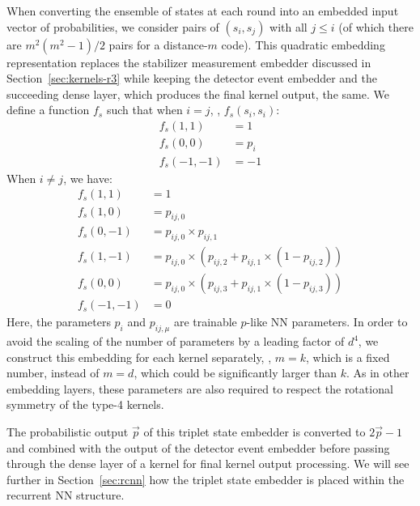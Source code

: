 When converting the ensemble of states at each round into an embedded input vector of probabilities, we consider pairs of $(s_i, s_j)$ with all $j\leq i$ (of which there are $m^2\left(m^2-1\right)/2$ pairs for a distance-$m$ code). 
This quadratic embedding representation replaces the stabilizer measurement embedder discussed in Section~\ref{sec:kernels-r3} while keeping the detector event embedder and the succeeding dense layer, which produces the final kernel output, the same.
We define a function $f_s$ such that when $i=j$, \ie, $f_s(s_i, s_i)$:
\begin{equation}
\begin{aligned}
f_s(1,1) &= 1 \\
f_s(0,0) &= p_i \\
f_s(-1,-1) &= -1
\end{aligned}
\end{equation}
When $i \neq j$, we have:
\begin{equation}
\begin{aligned}
f_s(1,1) &= 1 \\
f_s(1,0) &= p_{ij,0} \\
f_s(0,-1) &= p_{ij,0} \times p_{ij,1} \\
f_s(1,-1) &= p_{ij,0} \times \left(p_{ij,2} + p_{ij,1} \times \left(1-p_{ij,2}\right)\right) \\
f_s(0,0) &= p_{ij,0} \times \left(p_{ij,3} + p_{ij,1} \times \left(1-p_{ij,3}\right)\right) \\
f_s(-1,-1) &= 0
\end{aligned}
\end{equation}
Here, the parameters $p_i$ and $p_{ij,\mu}$ are trainable $p$-like NN parameters. In order to avoid the scaling of the number of parameters by a leading factor of $d^4$, we construct this embedding for each kernel separately, \ie, $m=k$, which is a fixed number, instead of $m=d$, which could be significantly larger than $k$. As in other embedding layers, these parameters are also required to respect the rotational symmetry of the type-4 kernels.

The probabilistic output $\vec{p}$ of this triplet state embedder is converted to $2\vec{p}-1$ and combined with the output of the detector event embedder before passing through the dense layer of a kernel for final kernel output processing. We will see further in Section~\ref{sec:rcnn} how the triplet state embedder is placed within the recurrent NN structure.
